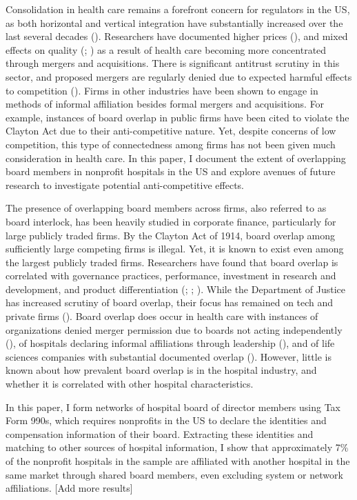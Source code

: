 \documentclass[12pt]{article}
\begin{document}
    Consolidation in health care remains a forefront concern for regulators in the US, as both horizontal and vertical integration have substantially increased over the last several decades (\cite{levinson2024ten}). Researchers have documented higher prices (\cite{brot2024pays}), and mixed effects on quality (\cite{kessler2000hospital}; \cite{cooper2011does}) as a result of health care becoming more concentrated through mergers and acquisitions. There is significant antitrust scrutiny in this sector, and proposed mergers are regularly denied due to expected harmful effects to competition (\cite{Meyer2022}). Firms in other industries have been shown to engage in methods of informal affiliation besides formal mergers and acquisitions. For example, instances of board overlap in public firms have been cited to violate the Clayton Act due to their anti-competitive nature. Yet, despite concerns of low competition, this type of connectedness among firms has not been given much consideration in health care. In this paper, I document the extent of overlapping board members in nonprofit hospitals in the US and explore avenues of future research to investigate 
    potential anti-competitive effects.

    The presence of overlapping board members across firms, also referred to as board interlock, has been heavily studied in corporate finance, particularly for large publicly traded firms. By the Clayton Act of 1914, board overlap among sufficiently large competing firms is illegal. Yet, it is known to exist even among the largest publicly traded firms. Researchers have found that board overlap is correlated with governance practices, performance, investment in research and development, and product differentiation (\cite{cai2014board}; \cite{lamb2016ties}; \cite{geng2021does}). While the Department of Justice has increased scrutiny of board overlap, their focus has remained on tech and private firms (\cite{Morse2023}). Board overlap does occur in health care with instances of organizations denied merger permission due to boards not acting independently (\cite{huberfeld2006tackling}), of hospitals declaring informal affiliations through leadership (\cite{barnett_babcock_2012}), and of life sciences companies with substantial documented overlap (\cite{manjunath2024illegal}). However, little is known about how prevalent board overlap is in the hospital industry, and whether it is correlated with other hospital characteristics. 

    In this paper, I form networks of hospital board of director members using Tax Form 990s, which requires nonprofits in the US to declare the identities and compensation information of their board. Extracting these identities and matching to other sources of hospital information, I show that approximately 7\% of the nonprofit hospitals in the sample are affiliated with another hospital in the same market through shared board members, even excluding system or network affiliations. [Add more results]
\end{document}
